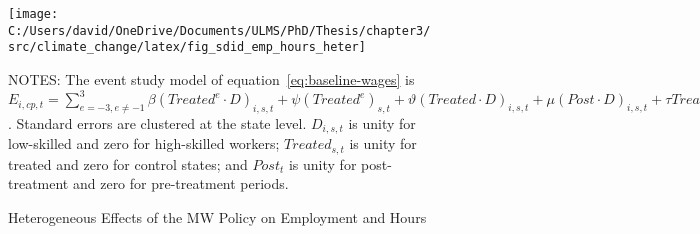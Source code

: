 \begin{figure}[H]
    \centering
    \texttt{[image: C:/Users/david/OneDrive/Documents/ULMS/PhD/Thesis/chapter3/src/climate\_change/latex/fig\_sdid\_emp\_hours\_heter]}
    \caption{Heterogeneous Effects of the MW Policy on Employment and Hours}
    \label{fig:baseline-manufacturing-industry-employment-heter}
    \begin{minipage}{\columnwidth}
        \vspace{0.05in}
        \tiny NOTES: The event study model of equation~\ref{eq:baseline-wages} is $E_{i,cp,t} = \sum_{{e = -3},{e \neq -1}}^{3} \beta (Treated^{e} \cdot D)_{i,s,t} + \psi (Treated^{e})_{s,t} + \vartheta (Treated \cdot D)_{i,s,t} + \mu (Post \cdot D)_{i,s,t} + \tau Treated_{s,t} + \rho D_{i,s,t} + \alpha Post_{t} + \delta X_{v,c,t-1} + \omega F_{f,t} + \lambda_{t} + \sigma_{c} + \phi_{cp} + \zeta_{cp,t} + \epsilon_{i,cp,t}$. Standard errors are clustered at the state level. $D_{i,s,t}$ is unity for low-skilled and zero for high-skilled workers; $Treated_{s,t}$ is unity for treated and zero for control states; and $Post_{t}$ is unity for post-treatment and zero for pre-treatment periods.
    \end{minipage}
\end{figure}

